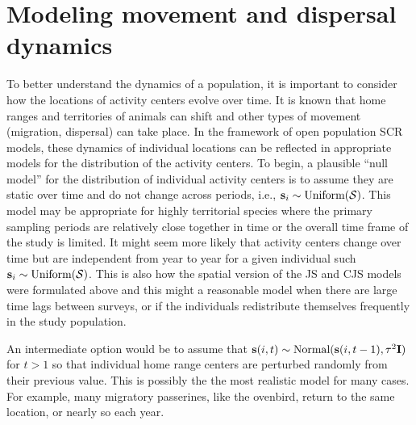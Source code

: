 \section{Modeling movement and dispersal dynamics}
\label{open.sec.ACdyanmics}

To better understand the dynamics of a population, it is important to consider 
how the locations of activity centers evolve over time. It is known that home ranges
and territories of animals can shift and other types of movement (migration, dispersal) 
can take place. In the framework of open population SCR models, these dynamics of 
individual locations can be reflected in appropriate models for the distribution of the activity centers.
To begin, a plausible ``null model'' for the
distribution of individual activity centers is to assume they are
static over time and do not change across periods,
i.e., ${\bf s}_{i} \sim \mbox{Uniform}({\cal S})$.  
This model may be appropriate for highly territorial species where the 
primary sampling periods are relatively close together in time or the overall 
time frame of the study is limited. 
It might seem more likely
that activity centers change over time but are independent from year to year for a
given individual such ${\bf s}_{i} \sim \mbox{Uniform}({\cal S})$.  This is also how
the spatial version of the JS and CJS models were formulated above and this might
a reasonable model when there are large time lags between surveys, or if the individuals redistribute themselves frequently
in the study population.

An intermediate option would be to assume that ${\bf s}(i,t) \sim \mbox{Normal}({\bf
  s}(i,t-1), \tau^{2} {\bf I})$ for $t > 1$ so that individual home range
centers are perturbed randomly from their previous value. 
This is possibly the the most realistic model for many cases.
For
example, many migratory passerines, like the ovenbird, return to the
same location, or nearly so each year.


